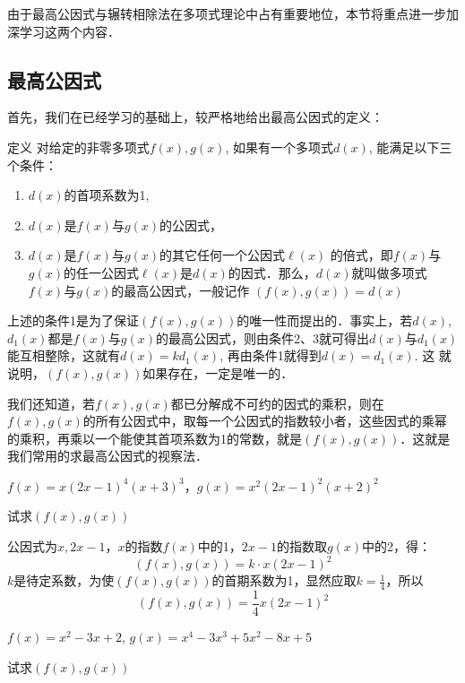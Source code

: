由于最高公因式与辗转相除法在多项式理论中占有重要地位，本节将重点进一步加深学习这两个内容．

\subsection{最高公因式}

首先，我们在已经学习的基础上，较严格地给出最高公因式的定义：

\begin{blk}{定义}
 对给定的非零多项式$f(x),g(x)$, 如果有一个多项式$d(x)$, 能满足以下三个条件：   
\begin{enumerate}
    \item $d(x)$的首项系数为1,
    \item $d(x)$是$f(x)$与$g(x)$的公因式，
    \item $d(x)$是$f(x)$与$g(x)$的其它任何一个公因式$\ell(x)$
    的倍式，即$f(x)$与$g(x)$的任一公因式$\ell(x)$是$d(x)$的因式．那么，$d(x)$就叫做多项式$f(x)$与$g(x)$的最高公因式，一般记作
    $(f (x) ,g (x) ) =d (x)$
\end{enumerate}
\end{blk}

上述的条件1是为了保证$(f(x),g(x))$的唯一性而提出的．事实上，若$d(x)$, $d_1(x)$都是$f(x)$与$g(x)$的最高公因式，则由条件2、3就可得出$d(x)$与$d_1(x)$能互相整除，这就有$d(x)=kd_1(x)$, 再由条件1就得到$d(x)=d_1(x)$. 这
就说明，$(f(x),g(x))$如果存在，一定是唯一的．

我们还知道，若$f(x),g(x)$都已分解成不可约的因式的乘积，则在$f(x),g(x)$的所有公因式中，取每一个公因式的指数较小者，这些因式的乘幂的乘积，再乘以一个能使其首项系数为1的常数，就是$(f(x),g(x))$．这就是我们常用的求最高公因式的视察法．


\begin{example}
$f(x)=x(2x-1)^4(x+3)^3$，$g(x)=x^2(2x-1)^2(x+2)^2$

试求$(f(x),g(x))$
\end{example}

\begin{solution}
    公因式为$x,2x-1$，$x$的指数$f(x)$中的1，$2x-1$的指数取$g(x)$中的2，得：
\[(f(x),g(x))=k\cdot x (2x-1)^2\]
$k$是待定系数，为使$(f(x),g(x))$的首期系数为1，显然应取$k=\frac{1}{4}$，所以
\[(f(x),g(x))=\frac{1}{4}  x (2x-1)^2\]
\end{solution}

\begin{example}
$f(x)=x^2-3x+2$, $g(x)=x^4-3x^3+5x^2-8x+5$

试求$(f(x),g(x))$
\end{example}

